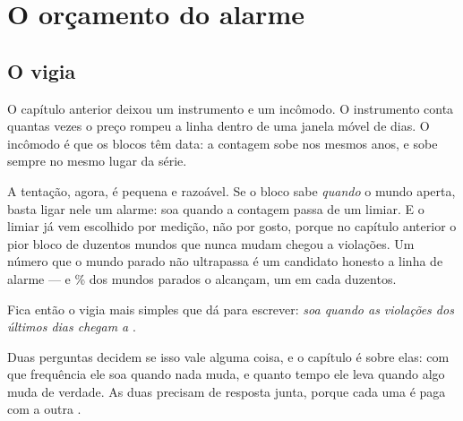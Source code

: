 %
%

\chapter{O orçamento do alarme}
\label{cap:orcamento}

\section{O vigia}

O capítulo anterior deixou um instrumento e um incômodo. O instrumento conta quantas vezes o
preço rompeu a linha dentro de uma janela móvel de \numVigiaBloco{} dias. O incômodo é que os
blocos têm data: a contagem sobe nos mesmos anos, e sobe sempre no mesmo lugar da série.

A tentação, agora, é pequena e razoável. Se o bloco sabe \emph{quando} o mundo aperta, basta
ligar nele um alarme: soa quando a contagem passa de um limiar. E o limiar já vem escolhido
por medição, não por gosto, porque no capítulo anterior o pior bloco de duzentos mundos que
nunca mudam chegou a \numNuncaMudaPiorBloco{} violações. Um número que o mundo parado não
ultrapassa é um candidato honesto a linha de alarme --- e \numVigiaMundosQueSoamPct\% dos mundos
parados o alcançam, um em cada duzentos.

Fica então o vigia mais simples que dá para escrever: \emph{soa quando as violações dos
últimos \numVigiaBloco{} dias chegam a \numVigiaLimiar}.

Duas perguntas decidem se isso vale alguma coisa, e o capítulo é sobre elas: com que
frequência ele soa quando nada muda, e quanto tempo ele leva quando algo muda de verdade. As
duas precisam de resposta junta, porque cada uma é paga com a outra\cite{ramdas2021hypothesis} \cite{wald1945sequential}.

